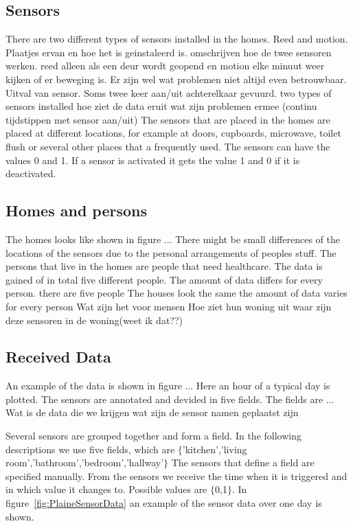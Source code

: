 \documentclass[11pt,a4paper]{article}
\begin{document}
\subsection{Sensors}
There are two different types of sensors installed in the homes. Reed and motion. Plaatjes ervan en hoe het is geinstaleerd is.
omschrijven hoe de twee sensoren werken. reed alleen als een deur wordt geopend en motion elke minuut weer kijken of er beweging is.
Er zijn wel wat problemen
niet altijd even betrouwbaar. Uitval van sensor. Soms twee keer aan/uit achterelkaar gevuurd.
two types of sensors installed
hoe ziet de data eruit wat zijn problemen ermee (continu tijdstippen met sensor aan/uit)
The sensors that are placed in the homes are placed at different locations, for example at doors, cupboards, microwave, toilet flush or several other places that a frequently used.
The sensors can have the values 0 and 1. If a sensor is activated it gets the value 1 and 0 if it is deactivated.
\subsection{Homes and persons}
The homes looks like shown in figure ... There might be small differences of the locations of the sensors due to the personal arrangements of peoples stuff.
The persons that live in the homes are people that need healthcare. The data is gained of in total five different people. The amount of data differs for every person.
there are five people
The houses look the same
the amount of data varies for every person
Wat zijn het voor mensen
Hoe ziet hun woning uit
waar zijn deze sensoren in de woning(weet ik dat??)
\subsection{Received Data}
An example of the data is shown in figure ... Here an hour of a typical day is plotted. 
The sensors are annotated and devided in five fields. The fields are ...
Wat is de data die we krijgen
wat zijn de sensor namen geplaatst zijn

 Several sensors are grouped together and form a field. In the following descriptions we use five fields, which are $\{$'kitchen','living room','bathroom','bedroom','hallway'$\}$
The sensors that define a field are specified manually.
From the sensors we receive the time when it is triggered and in which value it changes to. Possible values are $\{$0,1$\}$. In figure~\ref{fig:PlaineSensorData} an example of the sensor data over one day is shown.\\
\end{document}
